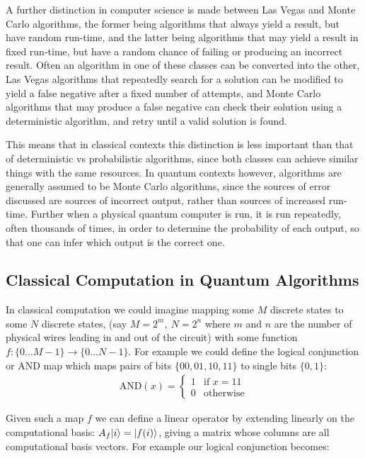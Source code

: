 A further distinction in computer science is made between Las Vegas and Monte Carlo algorithms, the former being algorithms that always yield a result, but have random run-time, and the latter being algorithms that may yield a result in fixed run-time, but have a random chance of failing or producing an incorrect result. Often an algorithm in one of these classes can be converted into the other, Las Vegas algorithms that repeatedly search for a solution can be modified to yield a false negative after a fixed number of attempts, and Monte Carlo algorithms that may produce a false negative can check their solution using a deterministic algorithm, and retry until a valid solution is found.

This means that in classical contexts this distinction is less important than that of deterministic vs probabilistic algorithms, since both classes can achieve similar things with the same resources. In quantum contexts however, algorithms are generally assumed to be Monte Carlo algorithms, since the sources of error discussed are sources of incorrect output, rather than sources of increased run-time. Further when a physical quantum computer is run, it is run repeatedly, often thousands of times, in order to determine the probability of each output, so that one can infer which output is the correct one.

\subsection{Classical Computation in Quantum Algorithms}

In classical computation we could imagine mapping some $M$ discrete states to some $N$ discrete states, (say $M = 2^m,\ N = 2^n$ where $m$ and $n$ are the number of physical wires leading in and out of the circuit) with some function $f: \{0\dots M-1\} \to \{0\dots N-1\}$. For example we could define the logical conjunction or AND map which maps pairs of bits $\{00, 01, 10, 11\}$ to single bits $\{0, 1\}$: 
\begin{align*}
\text{AND}(x) = \begin{cases}
1 & \text{if\ } x = 11\\
0 & \text{otherwise}
\end{cases}
\end{align*}

Given such a map $f$ we can define a linear operator by extending linearly on the computational basis: $A_f| i \rangle = | f(i) \rangle$, giving a matrix whose columns are all computational basis vectors. For example our logical conjunction becomes:

